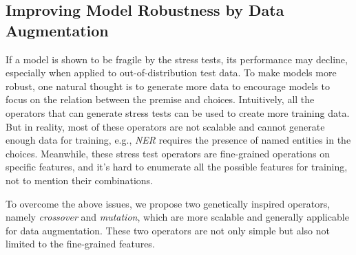 
\subsection{Improving Model Robustness by Data Augmentation}
\label{sec:aug}
If a model is shown to be fragile by the stress tests, 
its performance may decline, especially when applied to out-of-distribution test data.
To make models more robust, one natural thought is to generate more data to encourage models to focus on the 
relation between the premise and choices.
Intuitively, all the operators that can generate stress tests
can be used to create more training data.
But in reality, most of these operators are not scalable and 
cannot generate enough data for training, e.g., \textit{NER} requires the presence of named entities in the choices.
Meanwhile, these stress test operators are fine-grained operations on specific features, 
and it's hard to enumerate all the possible features for training, not to mention 
their combinations. 

To overcome the above issues,
we propose two genetically inspired operators, 
namely \textit{crossover} and \textit{mutation}, 
which are more scalable and generally applicable for data augmentation.
These two operators are  
not only simple but also not limited to the fine-grained features. 


